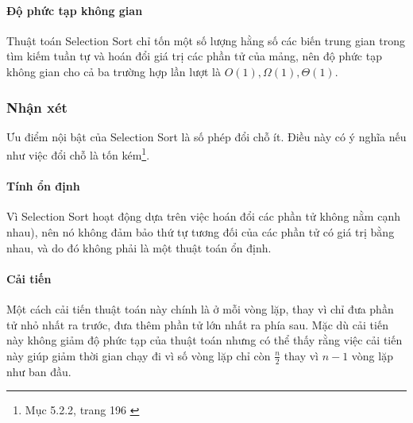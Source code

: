 \paragraph{Độ phức tạp không gian}
Thuật toán Selection Sort chỉ tốn một số lượng hằng số các biến trung gian trong tìm kiếm tuần tự và hoán đổi giá trị các phần tử của mảng, nên độ phức tạp không gian cho cả ba trường hợp lần lượt là $O(1), \Omega(1), \Theta(1)$.

 

\subsubsection{Nhận xét}

Ưu điểm nội bật của Selection Sort là số phép đổi chỗ ít. Điều này có ý nghĩa nếu như việc đổi chỗ là tốn kém\footnote{Mục 5.2.2, trang 196 \cite{dsa_nghia_2013}}. 


\paragraph{Tính ổn định} Vì Selection Sort hoạt động dựa trên việc hoán đổi các phần tử không nằm cạnh nhau), nên nó không đảm bảo thứ tự tương đối của các phần tử có giá trị bằng nhau, và do đó không phải là một thuật toán ổn định.


\paragraph{Cải tiến} Một cách cải tiến thuật toán này chính là ở mỗi vòng lặp, thay vì chỉ đưa phần tử nhỏ nhất ra trước, đưa thêm phần tử lớn nhất ra phía sau. Mặc dù cải tiến này không giảm độ phức tạp của thuật toán nhưng có thể thấy rằng việc cải tiến này giúp giảm thời gian chạy đi vì số vòng lặp chỉ còn $\frac{n}{2}$ thay vì $n - 1$ vòng lặp như ban đầu.